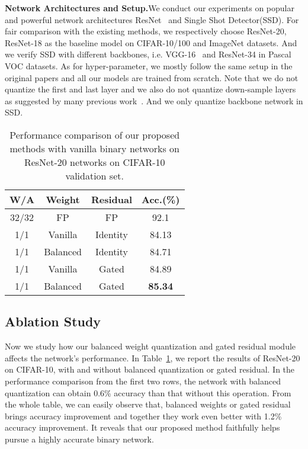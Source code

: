 \documentclass{article}
\begin{document}
\textbf{Network Architectures and Setup.}We conduct our experiments on popular and powerful network architectures ResNet~\cite{he2016deep} and Single Shot Detector(SSD\cite{liu2016ssd}). For fair comparison with the existing methods, we respectively choose  ResNet-20, ResNet-18 as the baseline model on CIFAR-10/100 and ImageNet datasets. And we verify SSD with different backbones, i.e. VGG-16~\cite{simonyan2014very} and ResNet-34 in Pascal VOC datasets. As for hyper-parameter, we mostly follow the same setup in the original papers and all our models are trained from scratch. Note that we do not quantize the first and last layer and we also do not quantize down-sample layers as suggested by many previous work~\cite{bethge2019back}. And we only quantize backbone network in SSD.
\begin{table}
	\centering
	\small
\renewcommand\arraystretch{1.05}
	\caption{Performance comparison of our proposed methods with vanilla binary networks on ResNet-20 networks on CIFAR-10 validation set.}
	\label{Balanced Results Comparison}
	\vspace{0.3em}
	\begin{tabular}{|c||c|c|c|}
		\hline
		W/A&Weight&Residual&Acc.(\%)\\
		\hline
		\hline
		32/32&FP&FP&92.1\\
		\hline
		1/1&Vanilla&Identity&84.13\\
1/1&Balanced&Identity&84.71\\
1/1&Vanilla&Gated&84.89\\
1/1&Balanced&Gated&\textbf{85.34}\\
		\hline
	\end{tabular}
	\vspace{-0.2in}
\end{table}	 	

\subsection{Ablation Study}
Now we study how our balanced weight quantization and gated residual module affects the network's performance. In Table~\ref{Balanced Results Comparison}, we report the results of ResNet-20 on CIFAR-10, with and without balanced quantization or gated residual. In the performance comparison from the first two rows, the network with balanced quantization can obtain 0.6\% accuracy than that without this operation. From the whole table, we can easily observe that, balanced weights or gated residual brings accuracy improvement and together they work even better with 1.2\% accuracy improvement. It reveals that our proposed method faithfully helps pursue a highly accurate binary network.
\end{document}
